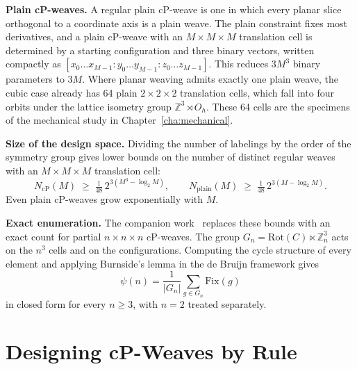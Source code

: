 \textbf{Plain cP-weaves.} A regular plain cP-weave is one in which every planar slice orthogonal to a coordinate axis is a plain weave. The plain constraint fixes most derivatives, and a plain cP-weave with an $M\times M\times M$ translation cell is determined by a starting configuration and three binary vectors, written compactly as $[x_0\ldots x_{M-1} : y_0\ldots y_{M-1} : z_0\ldots z_{M-1}]$. This reduces $3M^3$ binary parameters to $3M$. Where planar weaving admits exactly one plain weave, the cubic case already has 64 plain $2\times2\times2$ translation cells, which fall into four orbits under the lattice isometry group $\mathbb{Z}^3\rtimes O_h$. These 64 cells are the specimens of the mechanical study in Chapter~\ref{cha:mechanical}.

\textbf{Size of the design space.} Dividing the number of labelings by the order of the symmetry group gives lower bounds on the number of distinct regular weaves with an $M\times M\times M$ translation cell:
\begin{equation}
N_{\mathrm{cP}}(M)\;\ge\;\tfrac{1}{48}\,2^{3(M^3-\log_2 M)}, \qquad
N_{\mathrm{plain}}(M)\;\ge\;\tfrac{1}{48}\,2^{3(M-\log_2 M)}.
\end{equation}
Even plain cP-weaves grow exponentially with $M$.

\textbf{Exact enumeration.} The companion work~\cite{akpanya2025enumeration} replaces these bounds with an exact count for partial $n\times n\times n$ cP-weaves. The group $G_n=\mathrm{Rot}(C)\ltimes\mathbb{Z}_n^3$ acts on the $n^3$ cells and on the configurations. Computing the cycle structure of every element and applying Burnside's lemma in the de Bruijn framework gives
\begin{equation}
\psi(n)=\frac{1}{|G_n|}\sum_{g\in G_n}\mathrm{Fix}(g)
\end{equation}
in closed form for every $n\ge3$, with $n=2$ treated separately.

\section{Designing cP-Weaves by Rule}
\label{sec:cp-design}

